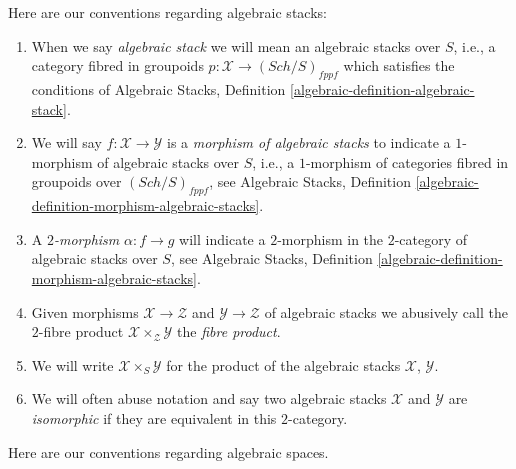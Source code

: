 \documentclass{stacks-project}
\theoremstyle{plain}
\theoremstyle{definition}
\theoremstyle{remark}
\numberwithin{equation}{subsection}
\def\Sch{\mathit{Sch}}
\begin{document}
\medskip\noindent
Here are our conventions regarding algebraic stacks:
\begin{enumerate}
\item When we say {\it algebraic stack} we will mean an algebraic
stacks over $S$, i.e., a category fibred in groupoids
$p : \mathcal{X} \to (\Sch/S)_{fppf}$
which satisfies the conditions of
Algebraic Stacks, Definition \ref{algebraic-definition-algebraic-stack}.
\item We will say $f : \mathcal{X} \to \mathcal{Y}$ is a
{\it morphism of algebraic stacks} to indicate a $1$-morphism
of algebraic stacks over $S$, i.e., a $1$-morphism of categories fibred
in groupoids over $(\Sch/S)_{fppf}$, see
Algebraic Stacks,
Definition \ref{algebraic-definition-morphism-algebraic-stacks}.
\item A {\it $2$-morphism} $\alpha : f \to g$ will
indicate a $2$-morphism in the $2$-category of algebraic stacks over
$S$, see
Algebraic Stacks,
Definition \ref{algebraic-definition-morphism-algebraic-stacks}.
\item Given morphisms $\mathcal{X} \to \mathcal{Z}$
and $\mathcal{Y} \to \mathcal{Z}$ of algebraic stacks
we abusively call the $2$-fibre product
$\mathcal{X} \times_\mathcal{Z} \mathcal{Y}$ the {\it fibre product}.
\item We will write $\mathcal{X} \times_S \mathcal{Y}$ for the
product of the algebraic stacks $\mathcal{X}$, $\mathcal{Y}$.
\item We will often abuse notation and say two algebraic stacks
$\mathcal{X}$ and $\mathcal{Y}$ are {\it isomorphic} if they are
equivalent in this $2$-category.
\end{enumerate}
Here are our conventions regarding algebraic spaces.
\end{document}
